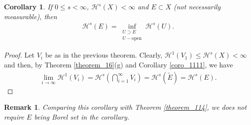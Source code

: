 \documentclass[11pt]{book}
\newtheorem{corollary}{Corollary}[theorem]
\newtheorem{remark}{Remark}[chapter]
\theoremstyle{definition}
\numberwithin{equation}{chapter}
\def\H{{\mathcal H}}
\begin{document}
\medskip

\begin{corollary}
If $0 \leq s < \infty$, $\H^s(X) < \infty$ and $E \subset X$ (not necessarily measurable), then \begin{align*}
    \H^s(E) =  \inf_{\substack{U \supset E\\ U - \text{open}}} \H^s(U).
\end{align*}
\end{corollary}
\begin{proof}
Let $V_i$ be as in the previous theorem. Clearly, $\H^1(V_1) \leq \H^s(X) < \infty$ and then, by Theorem \ref{theorem_16}(g) and Corollary \ref{coro_1111}, we have
\begin{align*}
    \lim_{i\to\infty} \H^1(V_i) = \H^s\left( \bigcap^\infty_{i=1} V_i\right) = \H^s(\widetilde{E}) = \H^s(E).
\end{align*}
\end{proof}

\medskip

\begin{remark}
Comparing this corollary with Theorem \ref{theorem_114}, we does not require $E$ being Borel set in the corollary.
\end{remark}

\medskip
\end{document}
